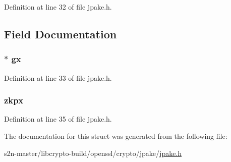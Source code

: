 Definition at line 32 of file jpake.\+h.



\subsection{Field Documentation}
\subsubsection[{\texorpdfstring{gx}{gx}}]{$\ast$ gx}\hypertarget{struct_j_p_a_k_e___s_t_e_p___p_a_r_t_a114e8fbd83fcf567581e9226feb9a43a}{}\label{struct_j_p_a_k_e___s_t_e_p___p_a_r_t_a114e8fbd83fcf567581e9226feb9a43a}


Definition at line 33 of file jpake.\+h.

\subsubsection[{\texorpdfstring{zkpx}{zkpx}}]{ zkpx}\hypertarget{struct_j_p_a_k_e___s_t_e_p___p_a_r_t_a91dc0671a490796b78cc7883f8ed9e2b}{}\label{struct_j_p_a_k_e___s_t_e_p___p_a_r_t_a91dc0671a490796b78cc7883f8ed9e2b}


Definition at line 35 of file jpake.\+h.



The documentation for this struct was generated from the following file\+:\begin{DoxyCompactItemize}
\item 
s2n-\/master/libcrypto-\/build/openssl/crypto/jpake/\hyperlink{jpake_8h}{jpake.\+h}\end{DoxyCompactItemize}
